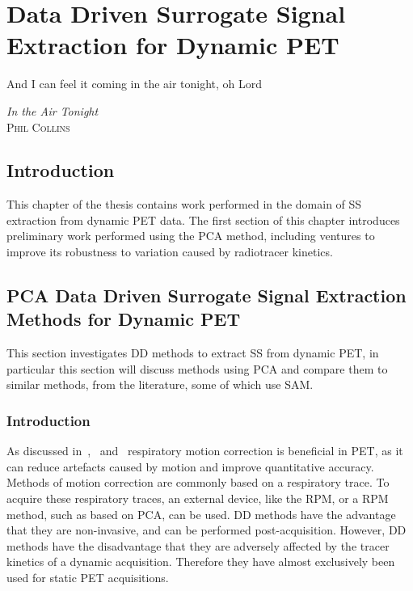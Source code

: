 \chapter{Data Driven Surrogate Signal Extraction for Dynamic PET} \label{sec:data_driven_surrogate_signal_extraction_for_dynamic_pet}
    \vspace*{\fill}
    \setlength{\epigraphwidth}{0.5\linewidth}
    \renewcommand{\epigraphflush}{flushright}
    \renewcommand{\epigraphsize}{\footnotesize}
    \epigraph{And I can feel it coming in the air tonight, oh Lord}%
              {\textit{In the Air Tonight}\\ \textsc{Phil Collins}}
    
    \newpage
    
    \section{Introduction} \label{sec:data_driven_surrogate_signal_extraction_results_introduction}
        This chapter of the thesis contains work performed in the domain of \gls{SS} extraction from dynamic \gls{PET} data. The first section of this chapter introduces preliminary work performed using the \gls{PCA} method, including ventures to improve its robustness to variation caused by radiotracer kinetics.
    
    \section{PCA Data Driven Surrogate Signal Extraction Methods for Dynamic PET} \label{sec:pca_data_driven_surrogate_signal_extraction_methods_for_Dynamic_pet}
        This section investigates \gls{DD} methods to extract \gls{SS} from dynamic \gls{PET}, in particular this section will discuss methods using \gls{PCA} and compare them to similar methods, from the literature, some of which use \gls{SAM}.
        
        \subsection{Introduction} \label{sec:pca_data_driven_surrogate_signal_extraction_methods_for_dynamic_pet_introduction}
            As discussed in~,~ and~ respiratory motion correction is beneficial in \gls{PET}, as it can reduce artefacts caused by motion and improve quantitative accuracy. Methods of motion correction are commonly based on a respiratory trace. To acquire these respiratory traces, an external device, like the \gls{RPM}, or a \gls{RPM} method, such as based on \gls{PCA}, can be used. \gls{DD} methods have the advantage that they are non-invasive, and can be performed post-acquisition. However, \gls{DD} methods have the disadvantage that they are adversely affected by the tracer kinetics of a dynamic acquisition. Therefore they have almost exclusively been used for static \gls{PET} acquisitions.

